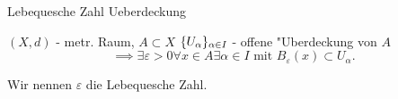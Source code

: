 \documentclass[class=article, crop=false]{standalone}
\begin{document}
\begin{zettel}{Lebequesche Zahl Ueberdeckung}
\begin{flashcard}
\begin{definition}
    $(X,d)$ - metr. Raum, $A \subset X$ 
    $\set{ U_{\alpha}  }_{\alpha \in  I}$ - offene "Uberdeckung von $A$ 
\[
    \implies \exists \varepsilon > 0 \forall x \in  A \exists \alpha \in  I \text{ mit } B_{\varepsilon } (x) \subset U_{\alpha } 
.\]

Wir nennen $\varepsilon $ die Lebequesche Zahl.
\end{definition}
\end{flashcard}
\end{zettel}
\end{document}
